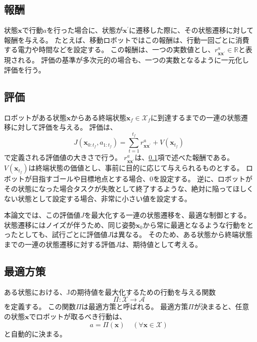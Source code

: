 \subsection{報酬} \label{subsection:reward}
状態$\bm{x}$で行動$a$を行った場合に、状態が$\bm{x}^{'}$に遷移した際に、その状態遷移に対して報酬を与える。
たとえば、移動ロボットではこの報酬は、行動一回ごとに消費する電力や時間などを設定する。
この報酬は、一つの実数値とし、$r^{a}_{\bm{x}\bm{x}^{'}} \in \mathbb{R}$と表現される。
評価の基準が多次元的の場合も、一つの実数となるように一元化し評価を行う。

\subsection{評価}
ロボットがある状態$\bm{x}$からある終端状態$\bm{x}_{f} \in \mathcal{X}_{f}$に到達するまでの一連の状態遷移に対して評価を与える。
評価は、
\begin{equation}
\label{evaluation}
  J( \bm{x}_{0:t_{f}}, a_{1:t_{f}} ) = \sum^{t_{f}}_{t=1} r^{a}_{\bm{x}\bm{x}^{'}} + V(\bm{x}_{t_{f}})
\end{equation}
で定義される評価値の大きさで行う。
$r^{a}_{\bm{x}\bm{x}^{'}}$は、\ref{subsection:reward}項で述べた報酬である。
$V(\bm{x}_{t_{f}})$は終端状態の価値とし、事前に目的に応じて与えられるものとする。
ロボットが目指すゴールや目標地点とする場合、$0$を設定する。
逆に、ロボットがその状態になった場合タスクが失敗として終了するような、絶対に陥ってほしくない状態として設定する場合、非常に小さい値を設定する。

本論文では、この評価値$J$を最大化する一連の状態遷移を、最適な制御とする。
状態遷移にはノイズが伴うため、同じ姿勢$\bm{x}_{0}$から常に最適となるような行動をとったとしても、試行ごとに評価値$J$は異なる。
そのため、ある状態から終端状態までの一連の状態遷移に対する評価$J$は、期待値として考える。

\subsection{最適方策}
ある状態における、Jの期待値を最大化するための行動を与える関数
\begin{equation}
\label{policy}
  \Pi : \mathcal{X} \rightarrow \mathcal{A}
\end{equation}
を定義する。
この関数$\Pi$は最適方策と呼ばれる。
最適方策$\Pi$が決まると、任意の状態$\bm{x}$でロボットが取るべき行動は、
\begin{equation}
\label{oprimal action}
  a = \Pi(\bm{x}) \;\;\;\; (\forall \bm{x} \in \mathcal{X})
\end{equation}
と自動的に決まる。

